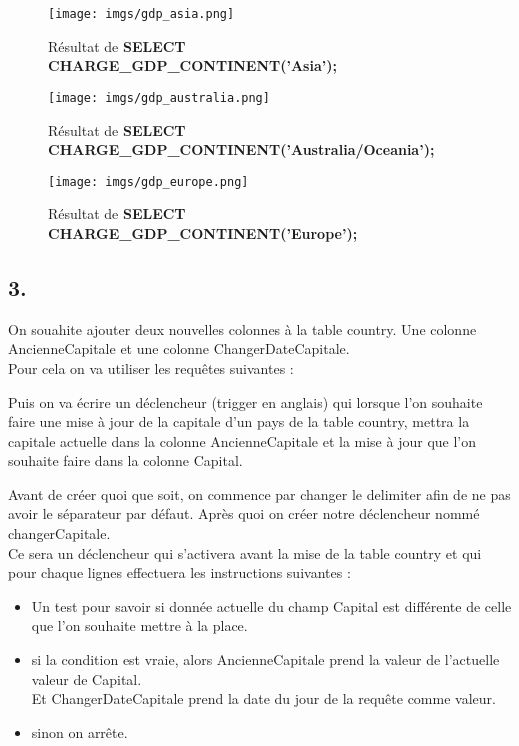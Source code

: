 \documentclass[11pt,a4paper]{article}
\begin{document}
\begin{figure}[ht]
	\centering
	\texttt{[image: imgs/gdp\_asia.png]}
	\caption{Résultat de \textbf{SELECT CHARGE\_GDP\_CONTINENT('Asia');}}
	\label{fig5}
\end{figure}

\begin{figure}[ht]
	\centering
	\texttt{[image: imgs/gdp\_australia.png]}
	\caption{Résultat de \textbf{SELECT CHARGE\_GDP\_CONTINENT('Australia/Oceania');}}
	\label{fig6}
\end{figure}

\newpage

\begin{figure}[ht]
	\centering
	\texttt{[image: imgs/gdp\_europe.png]}
	\caption{Résultat de \textbf{SELECT CHARGE\_GDP\_CONTINENT('Europe');}}
	\label{fig7}
\end{figure}

\subsection*{3.}
On souahite ajouter deux nouvelles colonnes à la table country. Une colonne AncienneCapitale et une colonne ChangerDateCapitale.\\
Pour cela on va utiliser les requêtes suivantes :



Puis on va écrire un déclencheur (trigger en anglais) qui lorsque l'on souhaite faire une mise à jour de la capitale d'un pays de la table country, mettra la capitale actuelle dans la colonne AncienneCapitale et la mise à jour que l'on souhaite faire dans la colonne Capital.



Avant de créer quoi que soit, on commence par changer le delimiter afin de ne pas avoir le séparateur par défaut. Après quoi on créer notre déclencheur nommé changerCapitale.\\
Ce sera un déclencheur qui s'activera avant la mise de la table country et qui pour chaque lignes effectuera les instructions suivantes :
\begin{itemize}
	\item Un test pour savoir si donnée actuelle du champ Capital est différente de celle que l'on souhaite mettre à la place.
	\item si la condition est vraie, alors AncienneCapitale prend la valeur de l'actuelle valeur de Capital.\\
	Et ChangerDateCapitale prend la date du jour de la requête comme valeur.
	\item sinon on arrête.
\end{itemize}
\end{document}
